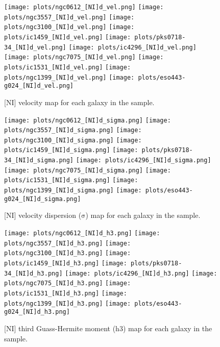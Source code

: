 \documentclass[fleqn,usenatbib,useAMS]{mnras}
\begin{document}
        \begin{figure*}
            \centering
            \texttt{[image: plots/ngc0612\_[NI]d\_vel.png]}
            \texttt{[image: plots/ngc3557\_[NI]d\_vel.png]}
            \texttt{[image: plots/ngc3100\_[NI]d\_vel.png]}
            \texttt{[image: plots/ic1459\_[NI]d\_vel.png]}
            \texttt{[image: plots/pks0718-34\_[NI]d\_vel.png]}
            \texttt{[image: plots/ic4296\_[NI]d\_vel.png]}
            \texttt{[image: plots/ngc7075\_[NI]d\_vel.png]}
            \texttt{[image: plots/ic1531\_[NI]d\_vel.png]}
            \texttt{[image: plots/ngc1399\_[NI]d\_vel.png]}
            \texttt{[image: plots/eso443-g024\_[NI]d\_vel.png]}
            \caption{[NI] velocity map for each galaxy in the sample.}
            \label{fig:NI_vel}
        \end{figure*}


        \begin{figure*}
            \centering
            \texttt{[image: plots/ngc0612\_[NI]d\_sigma.png]}
            \texttt{[image: plots/ngc3557\_[NI]d\_sigma.png]}
            \texttt{[image: plots/ngc3100\_[NI]d\_sigma.png]}
            \texttt{[image: plots/ic1459\_[NI]d\_sigma.png]}
            \texttt{[image: plots/pks0718-34\_[NI]d\_sigma.png]}
            \texttt{[image: plots/ic4296\_[NI]d\_sigma.png]}
            \texttt{[image: plots/ngc7075\_[NI]d\_sigma.png]}
            \texttt{[image: plots/ic1531\_[NI]d\_sigma.png]}
            \texttt{[image: plots/ngc1399\_[NI]d\_sigma.png]}
            \texttt{[image: plots/eso443-g024\_[NI]d\_sigma.png]}
            \caption{[NI] velocity dispersion ($\mathrm{\sigma}$) map for each galaxy in the sample.}
            \label{fig:NI_sigma}
        \end{figure*}


        \begin{figure*}
            \centering
            \texttt{[image: plots/ngc0612\_[NI]d\_h3.png]}
            \texttt{[image: plots/ngc3557\_[NI]d\_h3.png]}
            \texttt{[image: plots/ngc3100\_[NI]d\_h3.png]}
            \texttt{[image: plots/ic1459\_[NI]d\_h3.png]}
            \texttt{[image: plots/pks0718-34\_[NI]d\_h3.png]}
            \texttt{[image: plots/ic4296\_[NI]d\_h3.png]}
            \texttt{[image: plots/ngc7075\_[NI]d\_h3.png]}
            \texttt{[image: plots/ic1531\_[NI]d\_h3.png]}
            \texttt{[image: plots/ngc1399\_[NI]d\_h3.png]}
            \texttt{[image: plots/eso443-g024\_[NI]d\_h3.png]}
            \caption{[NI] third Guass-Hermite moment (h3) map for each galaxy in the sample.}
            \label{fig:NI_h3}
        \end{figure*}
\end{document}
